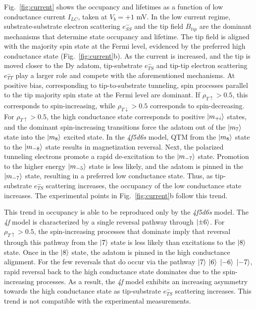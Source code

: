 \documentclass[
reprint,amsmath,amssymb,aps]{revtex4-2}
\begin{document}
Fig.~\ref{fig:current} shows the occupancy and lifetimes as a function of low conductance current $I_{LC}$, taken at $V_{b} = +1$ mV. In the low current regime, substrate-substrate electron scattering $e^{-}_{SS}$ and the tip field $B_{tip}$ are the dominant mechanisms that determine state occupancy and lifetime. The tip field is aligned with the majority spin state at the Fermi level, evidenced by the preferred high conductance state (Fig.~\ref{fig:current}b). As the current is increased, and the tip is moved closer to the Dy adatom, tip-substrate $e^{-}_{TS}$ and tip-tip electron scattering $e^{-}_{TT}$ play a larger role and compete with the aforementioned mechanisms. At positive bias, corresponding to tip-to-substrate tunneling, spin processes parallel to the tip majority spin state at the Fermi level are dominant. If $\rho_{T \uparrow} > 0.5$, this corresponds to spin-increasing, while $\rho_{T \downarrow} > 0.5$ corresponds to spin-decreasing. For $\rho_{T \uparrow} > 0.5 $, the high conductance state corresponds to positive $\ket{m_{+i}}$ states, and the dominant spin-increasing transitions force the adatom out of the $\ket{m_{7}}$ state into the $\ket{m_{8}}$ excited state. In the \textit{4f5d6s} model, QTM from the $\ket{m_{8}}$ state to the $\ket{m_{-8}}$ state results in magnetization reversal. Next, the polarized tunneling electrons promote a rapid de-excitation to the $\ket{m_{-7}}$ state. Promotion to the higher energy $\ket{m_{-5}}$ state is less likely, and the adatom is pinned in the $\ket{m_{-7}}$ state, resulting in a preferred low conductance state. Thus, as tip-substrate $e^{-}_{TS}$ scattering increases, the occupancy of the low conductance state increases. The experimental points in Fig.~\ref{fig:current}b follow this trend. 

This trend in occupancy is able to be reproduced only by the \textit{4f5d6s} model. The \textit{4f} model is characterized by a single reversal pathway through $\ket{\pm 6}$. For $\rho_{T \uparrow} > 0.5 $, the spin-increasing processes that dominate imply that reversal through this pathway from the $\ket{7}$ state is less likely than excitations to the $\ket{8}$ state. Once in the $\ket{8}$ state, the adatom is pinned in the high conductance alignment. For the few reversals that do occur via the pathway $\ket{7}$ \xrightarrow{} $\ket{6}$ \xrightarrow{} $\ket{-6}$ \xrightarrow{} $\ket{-7}$, rapid reversal back to the high conductance state dominates due to the spin-increasing processes. As a result, the \textit{4f} model exhibits an increasing asymmetry towards the high conductance state as tip-substrate $e^{-}_{TS}$ scattering increases. This trend is not compatible with the experimental measurements. 
\end{document}

